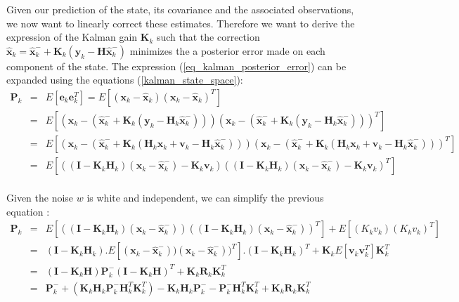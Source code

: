 \documentclass[10pt,oneside]{scrartcl}
\newcommand\vecteur[1]{\boldsymbol#1}
\newcommand\matrice[1]{\mathbf#1}
\begin{document}
Given our prediction of the state, its covariance and the associated observations, we now want to linearly correct these estimates. Therefore we want to derive the expression of the Kalman gain $\matrice{K_k}$ such that the correction $\hat{\vecteur{x}}_k = \hat{\vecteur{x}}_k^- + \matrice{K}_k (\vecteur{y}_k - \matrice{H} \hat{\vecteur{x}}_k^-)$ minimizes the a posterior error made on each component of the state. The expression (\ref{eq_kalman_posterior_error}) can be expanded using the equations (\ref{kalman_state_space}): 
\begin{eqnarray}
\nonumber \matrice{P_k} &=& E[\vecteur{e}_k \vecteur{e}_k^T] = E[(\vecteur{x}_k - \hat{\vecteur{x}}_k)(\vecteur{x}_k - \hat{\vecteur{x}}_k)^T]\\
\nonumber     &=& E[(\vecteur{x}_k - (\hat{\vecteur{x}}^-_k + \matrice{K}_k (\vecteur{y}_k - \matrice{H}_k \hat{\vecteur{x}}^-_k)))(\vecteur{x}_k - (\hat{\vecteur{x}}^-_k + \matrice{K}_k (\vecteur{y}_k - \matrice{H}_k \hat{\vecteur{x}}^-_k)))^T]\\
\nonumber     &=& E[(\vecteur{x}_k - (\hat{\vecteur{x}}^-_k + \matrice{K}_k (\matrice{H}_k \vecteur{x}_k + \vecteur{v}_k - \matrice{H}_k \hat{\vecteur{x}}^-_k)))(\vecteur{x}_k - (\hat{\vecteur{x}}^-_k + \matrice{K}_k (\matrice{H}_k \vecteur{x}_k + \vecteur{v}_k - \matrice{H}_k \hat{\vecteur{x}}^-_k)))^T]\\
\nonumber     &=& E[((\matrice{I} - \matrice{K_k} \matrice{H}_k)(\vecteur{x_k} - \hat{\vecteur{x}}^-_k) - \matrice{K_k} \vecteur{v_k})((\matrice{I} - \matrice{K_k} \matrice{H}_k)(\vecteur{x_k} - \hat{\vecteur{x}}^-_k) - \matrice{K_k} \vecteur{v_k})^T]\\
\end{eqnarray}

Given the noise $w$ is white and independent, we can simplify the previous equation :
\begin{eqnarray}
\nonumber \matrice{P_k} &=& E[((\matrice{I} - \matrice{K_k} \matrice{H}_k)(\vecteur{x_k} - \hat{\vecteur{x}}^-_k))((\matrice{I} - \matrice{K_k} \matrice{H}_k)(\vecteur{x_k} - \hat{\vecteur{x}}^-_k))^T] + E[(K_k v_k)(K_k v_k)^T]\\
\nonumber &=& (\matrice{I} - \matrice{K_k} \matrice{H}_k).E[(\vecteur{x_k} - \hat{\vecteur{x}}^-_k))(\vecteur{x_k} - \hat{\vecteur{x}}^-_k))^T].(\matrice{I} - \matrice{K_k} \matrice{H}_k)^T + \matrice{K_k} E[\vecteur{v_k} \vecteur{v_k}^T] \matrice{K_k}^T \\
\label{joseph_form} &=& (\matrice{I} - \matrice{K_k} \matrice{H}) \matrice{P^-_k} (\matrice{I} - \matrice{K_k} \matrice{H})^T + \matrice{K_k} \matrice{R_k} \matrice{K_k}^T \\
\label{eq_kalman_estimate_cov} &=& \matrice{P^-_k} + (\matrice{K_k} \matrice{H}_k \matrice{P^-_k} \matrice{H}_k^T \matrice{K_k}^T) - \matrice{K_k} \matrice{H}_k \matrice{P^-_k} - \matrice{P^-_k} \matrice{H}_k^T \matrice{K_k}^T +  \matrice{K_k} \matrice{R_k} \matrice{K_k}^T
\end{eqnarray}
\end{document}
